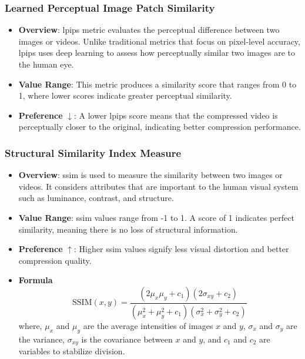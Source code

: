 \documentclass{ioereport}
\begin{document}
        \subsubsection{Learned Perceptual Image Patch Similarity}
            \begin{itemize}
                \item \textbf{Overview}: \gls{lpips} metric evaluates the perceptual difference between two images or videos. Unlike traditional metrics that focus on pixel-level accuracy, \gls{lpips} uses deep learning to assess how perceptually similar two images are to the human eye.
                \item \textbf{Value Range}: This metric produces a similarity score that ranges from 0 to 1, where lower scores indicate greater perceptual similarity.
                \item \textbf{Preference} $\downarrow$: A lower \gls{lpips} score means that the compressed video is perceptually closer to the original, indicating better compression performance.
            \end{itemize}

        \subsubsection{Structural Similarity Index Measure}
            \begin{itemize}
                \item \textbf{Overview}: \gls{ssim} is used to measure the similarity between two images or videos. It considers attributes that are important to the human visual system such as luminance, contrast, and structure.
                \item \textbf{Value Range}: \gls{ssim} values range from -1 to 1. A score of 1 indicates perfect similarity, meaning there is no loss of structural information.
                \item \textbf{Preference} $\uparrow$: Higher \gls{ssim} values signify less visual distortion and better compression quality.
                \item \textbf{Formula}
                \begin{equation}\label{eqn:SSIM}
                    \text{SSIM}(x, y) = \frac{(2 \mu_x \mu_y + c_1)(2 \sigma_{xy} + c_2)}{(\mu_x^2 + \mu_y^2 + c_1)(\sigma_x^2 + \sigma_y^2 + c_2)}
                \end{equation}
                where, $\mu_x$ and $\mu_y$ are the average intensities of images $x$ and $y$, $\sigma_{x}$ and $\sigma_y$ are the variance, $\sigma_{xy}$ is the covariance between $x$ and $y$, and $c_1$ and $c_2$ are variables to stabilize division.
            \end{itemize}
\end{document}
